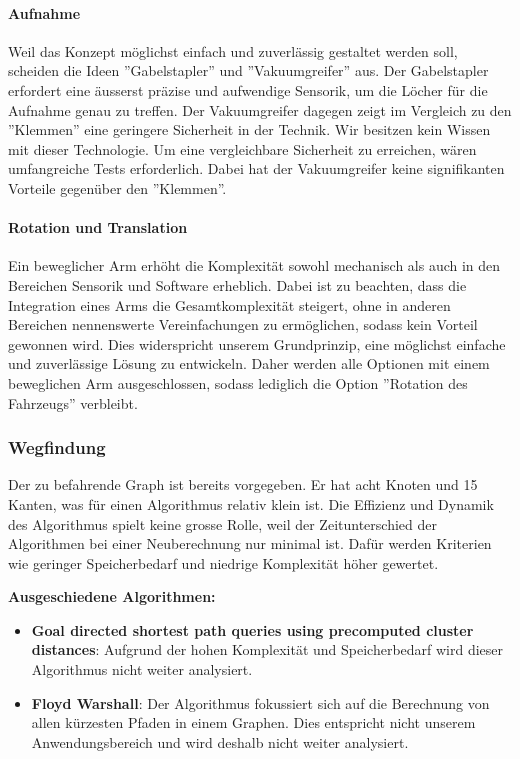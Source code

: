 \documentclass[../main.tex]{subfiles}
\begin{document}
    \paragraph{Aufnahme}
    Weil das Konzept möglichst einfach und zuverlässig gestaltet werden soll, scheiden die Ideen ''Gabelstapler'' und ''Vakuumgreifer'' aus. Der Gabelstapler erfordert eine äusserst präzise und aufwendige Sensorik, um die Löcher für die Aufnahme genau zu treffen. Der Vakuumgreifer dagegen zeigt im Vergleich zu den ''Klemmen'' eine geringere Sicherheit in der Technik. Wir besitzen kein Wissen mit dieser Technologie. Um eine vergleichbare Sicherheit zu erreichen, wären umfangreiche Tests erforderlich. Dabei hat der Vakuumgreifer keine signifikanten Vorteile gegenüber den ''Klemmen''.
        
    \paragraph{Rotation und Translation}
    Ein beweglicher Arm erhöht die Komplexität sowohl mechanisch als auch in den Bereichen Sensorik und Software erheblich. Dabei ist zu beachten, dass die Integration eines Arms die Gesamtkomplexität steigert, ohne in anderen Bereichen nennenswerte Vereinfachungen zu ermöglichen, sodass kein Vorteil gewonnen wird. Dies widerspricht unserem Grundprinzip, eine möglichst einfache und zuverlässige Lösung zu entwickeln. Daher werden alle Optionen mit einem beweglichen Arm ausgeschlossen, sodass lediglich die Option ''Rotation des Fahrzeugs'' verbleibt.


\newpage
\subsubsection{Wegfindung}

Der zu befahrende Graph ist bereits vorgegeben. Er hat acht Knoten und 15 Kanten, was 
für einen Algorithmus relativ klein ist. Die Effizienz und Dynamik des Algorithmus spielt keine grosse Rolle, weil der Zeitunterschied der Algorithmen bei einer Neuberechnung nur minimal ist. Dafür werden Kriterien wie geringer Speicherbedarf und niedrige Komplexität höher gewertet.

\textbf{Ausgeschiedene Algorithmen:}

\begin{itemize}
    \item \textbf{Goal directed shortest path queries using precomputed cluster distances}: Aufgrund der hohen Komplexität und Speicherbedarf wird dieser Algorithmus nicht weiter analysiert.
    \item \textbf{Floyd Warshall}: Der Algorithmus fokussiert sich auf die Berechnung von allen kürzesten Pfaden in einem Graphen. Dies entspricht nicht unserem Anwendungsbereich und wird deshalb nicht weiter analysiert.
\end{itemize}
\end{document}
